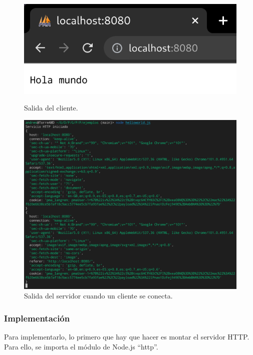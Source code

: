 \documentclass{article}
\begin{document}
\begin{figure}[H]
    \centering
    \begin{minipage}[H]{0.49\textwidth}
        \centering
        \includegraphics[width=\textwidth]{images/helloworldC.png}
        \caption{Salida del cliente.}
    \end{minipage}
    \hfill
    \begin{minipage}[H]{0.49\textwidth}
        \centering
        \includegraphics[width=\textwidth]{images/helloworldS.png}
        \caption{Salida del servidor cuando un cliente se conecta.}
    \end{minipage}
\end{figure}

\subsubsection{Implementación}
Para implementarlo, lo primero que hay que hacer es montar el servidor HTTP. Para ello, se importa el módulo de Node.js ``http''.
\end{document}
